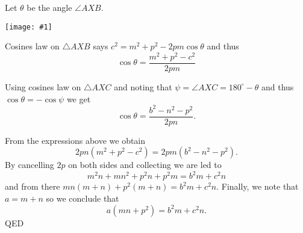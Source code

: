 \documentclass[12pt]{article}
\newcommand{\figura}[1]{\begin{center}\texttt{[image: \#1]}\end{center}}
\begin{document}
Let $\theta$ be the angle $\angle AXB$.
\figura{stewart}

Cosines law on $\triangle AXB$ says 
$c^2=m^2 + p^2-2pm\cos \theta$ and thus
$$\cos \theta =\frac{m^2+p^2-c^2}{2pm}$$

Using cosines law on $\triangle AXC$ and noting that $\psi=\angle AXC=180^\circ-\theta$ and thus $\cos \theta=-\cos\psi$ we get
$$\cos \theta =\frac{b^2-n^2-p^2}{2pn}.$$

From the expressions above we obtain
$$2pn(m^2+p^2-c^2)=2pm(b^2-n^2-p^2).$$
By cancelling $2p$ on both sides and collecting we are led to
$$m^2n +mn^2 +p^2n +p^2m = b^2m + c^2 n$$
and from there
$mn(m+n)+p^2(m+n)=b^2m+c^2n$. Finally, we note that $a=m+n$ so we conclude that
$$a(mn+p^2)=b^2m+c^2n.$$
QED
\end{document}
